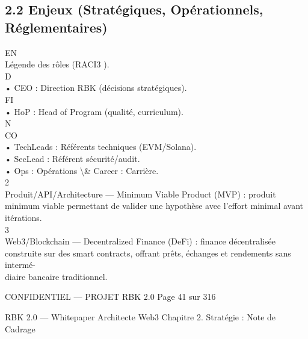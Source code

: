 \subsection{2.2 Enjeux (Stratégiques, Opérationnels, Réglementaires)}
\vspace{0.5em}
\vspace{0.5em}
\vspace{0.5em}
\vspace{0.5em}
EN\\
Légende des rôles (RACI3 ).\\
\vspace{0.5em}
\vspace{0.5em}
\vspace{0.5em}
\vspace{0.5em}
D\\
• CEO : Direction RBK (décisions stratégiques).\\
\vspace{0.5em}
\vspace{0.5em}
\vspace{0.5em}
\vspace{0.5em}
FI\\
• HoP : Head of Program (qualité, curriculum).\\
N\\
CO\\
• TechLeads : Référents techniques (EVM/Solana).\\
\vspace{0.5em}
• SecLead : Référent sécurité/audit.\\
\vspace{0.5em}
• Ops : Opérations \textbackslash{}& Career : Carrière.\\
2\\
Produit/API/Architecture — Minimum Viable Product (MVP) : produit minimum viable permettant de valider une hypothèse avec l’effort minimal avant itérations.\\
3\\
Web3/Blockchain — Decentralized Finance (DeFi) : finance décentralisée construite sur des smart contracts, offrant prêts, échanges et rendements sans intermé-\\
diaire bancaire traditionnel.\\
\vspace{0.5em}
\vspace{0.5em}
\vspace{0.5em}
\vspace{0.5em}
\begin{confidential}CONFIDENTIEL — PROJET RBK 2.0                                           Page 41 sur 316\end{confidential}
RBK 2.0 — Whitepaper Architecte Web3                                                                 Chapitre 2. Stratégie : Note de Cadrage\\
\vspace{0.5em}
\vspace{0.5em}
\vspace{0.5em}
